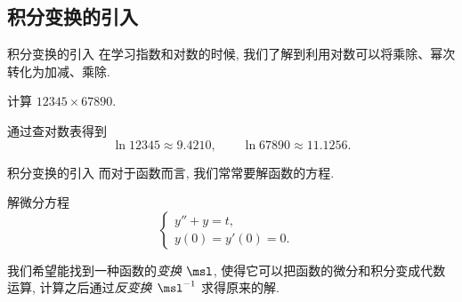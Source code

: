 
\subsection{积分变换的引入}

\begin{frame}{积分变换的引入}
	\onslide<+->
	在学习指数和对数的时候, 我们了解到利用对数可以将乘除、幂次转化为加减、乘除.
	\onslide<+->
	\begin{example}
		计算 $12345\times 67890$.
	\end{example}
	\onslide<+->
	\begin{solution}
		通过查对数表得到
		\[
			\ln 12345\approx 9.4210,\qquad\ln 67890\approx 11.1256.
		\]
		\vspace{-\baselineskip}
	\end{solution}
\end{frame}


\begin{frame}{积分变换的引入}
	\onslide<+->
	而对于函数而言, 我们常常要解函数的方程.
	\onslide<+->
	\begin{example}
		解微分方程
		\[\begin{cases}
			y''+y=t,&\\
			y(0)=y'(0)=0.&
		\end{cases}\]
	\end{example}
	\onslide<+->
	\begin{solution*}
			我们希望能找到一种函数的\emph{变换 $\msl$}, 使得它可以把函数的微分和积分变成代数运算, 计算之后通过\emph{反变换 $\msl^{-1}$} 求得原来的解.

	\end{solution*}
\end{frame}

